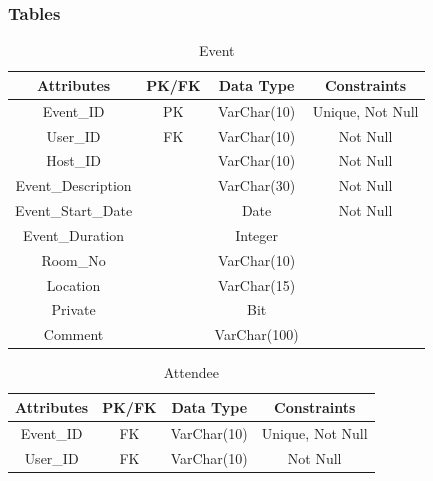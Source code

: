 \documentclass[a4paper]{article}
\begin{document}
\subsubsection{Tables}
\begin{table}[ht]
    \caption{Event}
    \centering
    \begin{tabular}{|c|c|c|c|}
        \hline
        Attributes & PK/FK & Data Type & Constraints  \\
        \hline
        Event\_ID & PK & VarChar(10) & Unique, Not Null \\
        \hline
        User\_ID & FK & VarChar(10) & Not Null \\
        \hline
        Host\_ID & & VarChar(10) & Not Null \\
        \hline
        Event\_Description & & VarChar(30) & Not Null \\
        \hline
        Event\_Start\_Date & & Date & Not Null \\
        \hline
        Event\_Duration & & Integer & \\
        \hline
        Room\_No & & VarChar(10) & \\
        \hline
        Location & & VarChar(15) & \\
        \hline
        Private & & Bit & \\
        \hline
        Comment & & VarChar(100) & \\
        \hline
    \end{tabular}
    \label{tab:event}
\end{table}

\begin{table}[ht]
    \caption{Attendee}
    \centering
    \begin{tabular}{|c|c|c|c|}
        \hline
        Attributes & PK/FK & Data Type & Constraints  \\
        \hline
        Event\_ID & FK & VarChar(10) & Unique, Not Null \\
        \hline
        User\_ID & FK & VarChar(10) & Not Null \\
        \hline
    \end{tabular}
    \label{tab:attendee}
\end{table}
\end{document}
